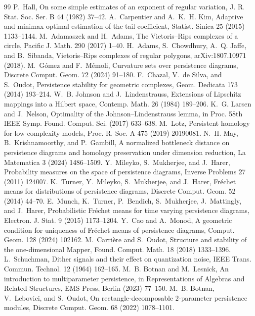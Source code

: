 \documentclass[11pt]{article}
\theoremstyle{definition}
\begin{document}
\begin{thebibliography}{99}
 P.~Hall, On some simple estimates of an exponent of regular variation, J. R. Stat. Soc. Ser. B 44 (1982) 37--42.
 A.~Carpentier and A.~K.~H. Kim, Adaptive and minimax optimal estimation of the tail coefficient, Statist. Sinica 25 (2015) 1133--1144.
 M.~Adamaszek and H.~Adams, The Vietoris--Rips complexes of a circle, Pacific J. Math. 290 (2017) 1--40.
 H.~Adams, S.~Chowdhury, A.~Q. Jaffe, and B.~Sibanda, Vietoris--Rips complexes of regular polygons, arXiv:1807.10971 (2018).
 M.~G\'omez and F.~M\'emoli, Curvature sets over persistence diagrams, Discrete Comput. Geom. 72 (2024) 91--180.
 F.~Chazal, V.~de Silva, and S.~Oudot, Persistence stability for geometric complexes, Geom. Dedicata 173 (2014) 193--214.
 W.~B. Johnson and J.~Lindenstrauss, Extensions of Lipschitz mappings into a Hilbert space, Contemp. Math. 26 (1984) 189--206.
 K.~G. Larsen and J.~Nelson, Optimality of the Johnson--Lindenstrauss lemma, in Proc. 58th IEEE Symp. Found. Comput. Sci. (2017) 633--638.
 M.~Lotz, Persistent homology for low-complexity models, Proc. R. Soc. A 475 (2019) 20190081.
 N.~H. May, B.~Krishnamoorthy, and P.~Gambill, A normalized bottleneck distance on persistence diagrams and homology preservation under dimension reduction, La Matematica 3 (2024) 1486--1509.
 Y.~Mileyko, S.~Mukherjee, and J.~Harer, Probability measures on the space of persistence diagrams, Inverse Problems 27 (2011) 124007.
 K.~Turner, Y.~Mileyko, S.~Mukherjee, and J.~Harer, Fr\'echet means for distributions of persistence diagrams, Discrete Comput. Geom. 52 (2014) 44--70.
 E.~Munch, K.~Turner, P.~Bendich, S.~Mukherjee, J.~Mattingly, and J.~Harer, Probabilistic Fr\'echet means for time varying persistence diagrams, Electron. J. Stat. 9 (2015) 1173--1204.
 Y.~Cao and A.~Monod, A geometric condition for uniqueness of Fr\'echet means of persistence diagrams, Comput. Geom. 128 (2024) 102162.
 M.~Carri\`ere and S.~Oudot, Structure and stability of the one-dimensional Mapper, Found. Comput. Math. 18 (2018) 1333--1396.
 L.~Schuchman, Dither signals and their effect on quantization noise, IEEE Trans. Commun. Technol. 12 (1964) 162--165.
 M.~B. Botnan and M.~Lesnick, An introduction to multiparameter persistence, in Representations of Algebras and Related Structures, EMS Press, Berlin (2023) 77--150.
 M.~B. Botnan, V.~Lebovici, and S.~Oudot, On rectangle-decomposable 2-parameter persistence modules, Discrete Comput. Geom. 68 (2022) 1078--1101.

\end{thebibliography}
\end{document}
